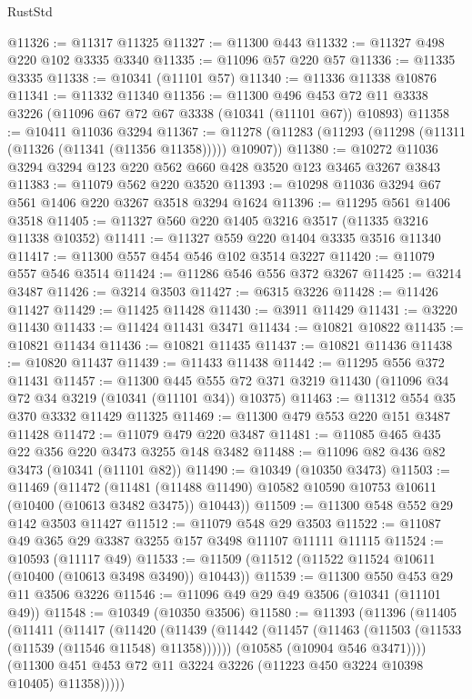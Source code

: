\begin{lexlean}{RustStd}
\begin{coremodule}
@11326 := @11317 @11325
@11327 := @11300 @443
@11332 := @11327 @498 @220 @102 @3335 @3340
@11335 := @11096 @57 @220 @57
@11336 := @11335 @3335
@11338 := @10341 (@11101 @57)
@11340 := @11336 @11338 @10876
@11341 := @11332 @11340
@11356 := @11300
    @496
    @453
    @72
    @11
    @3338
    @3226
    (@11096 @67 @72 @67 @3338 (@10341 (@11101 @67)) @10893)
@11358 := @10411 @11036 @3294
@11367 := @11278 (@11283 (@11293 (@11298 (@11311 (@11326 (@11341 (@11356 @11358))))) @10907))
@11380 := @10272 @11036 @3294 @3294 @123 @220 @562 @660 @428 @3520 @123 @3465 @3267 @3843
@11383 := @11079 @562 @220 @3520
@11393 := @10298 @11036 @3294 @67 @561 @1406 @220 @3267 @3518 @3294 @1624
@11396 := @11295 @561 @1406 @3518
@11405 := @11327 @560 @220 @1405 @3216 @3517 (@11335 @3216 @11338 @10352)
@11411 := @11327 @559 @220 @1404 @3335 @3516 @11340
@11417 := @11300 @557 @454 @546 @102 @3514 @3227
@11420 := @11079 @557 @546 @3514
@11424 := @11286 @546 @556 @372 @3267
@11425 := @3214 @3487
@11426 := @3214 @3503
@11427 := @6315 @3226
@11428 := @11426 @11427
@11429 := @11425 @11428
@11430 := @3911 @11429
@11431 := @3220 @11430
@11433 := @11424 @11431 @3471
@11434 := @10821 @10822
@11435 := @10821 @11434
@11436 := @10821 @11435
@11437 := @10821 @11436
@11438 := @10820 @11437
@11439 := @11433 @11438
@11442 := @11295 @556 @372 @11431
@11457 := @11300
    @445
    @555
    @72
    @371
    @3219
    @11430
    (@11096 @34 @72 @34 @3219 (@10341 (@11101 @34)) @10375)
@11463 := @11312 @554 @35 @370 @3332 @11429 @11325
@11469 := @11300 @479 @553 @220 @151 @3487 @11428
@11472 := @11079 @479 @220 @3487
@11481 := @11085 @465 @435 @22 @356 @220 @3473 @3255 @148 @3482
@11488 := @11096 @82 @436 @82 @3473 (@10341 (@11101 @82))
@11490 := @10349 (@10350 @3473)
@11503 := @11469
    (@11472
      (@11481 (@11488 @11490) @10582 @10590 @10753 @10611 (@10400 (@10613 @3482 @3475)) @10443))
@11509 := @11300 @548 @552 @29 @142 @3503 @11427
@11512 := @11079 @548 @29 @3503
@11522 := @11087 @49 @365 @29 @3387 @3255 @157 @3498 @11107 @11111 @11115
@11524 := @10593 (@11117 @49)
@11533 := @11509 (@11512 (@11522 @11524 @10611 (@10400 (@10613 @3498 @3490)) @10443))
@11539 := @11300 @550 @453 @29 @11 @3506 @3226
@11546 := @11096 @49 @29 @49 @3506 (@10341 (@11101 @49))
@11548 := @10349 (@10350 @3506)
@11580 := @11393
    (@11396
      (@11405
        (@11411
          (@11417
            (@11420
              (@11439
                (@11442 (@11457 (@11463 (@11503 (@11533 (@11539 (@11546 @11548) @11358))))))
                (@10585 (@10904 @546 @3471))))
            (@11300 @451 @453 @72 @11 @3224 @3226 (@11223 @450 @3224 @10398 @10405) @11358)))))

\end{coremodule}
\end{lexlean}
